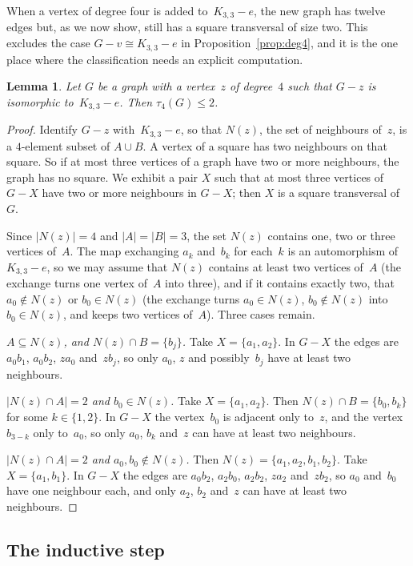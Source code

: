 \documentclass[11pt,letterpaper]{article}
\numberwithin{equation}{section}
\theoremstyle{plain}
\newtheorem{lemma}[theorem]{Lemma}
\theoremstyle{definition}
\theoremstyle{remark}
\newcommand{\Kme}{K_{3,3}-e}
\begin{document}
When a vertex of degree four is added to~$\Kme$, the new graph has twelve edges but, as we now show, still has a square transversal of size two. This excludes the case $G-v\cong\Kme$ in Proposition~\ref{prop:deg4}, and it is the one place where the classification needs an explicit computation.

\begin{lemma}\label{lem:extension}
Let $G$ be a graph with a vertex~$z$ of degree~$4$ such that $G-z$ is isomorphic to~$\Kme$. Then $\tau_4(G)\le2$.
\end{lemma}

\begin{proof}
Identify $G-z$ with~$\Kme$, so that $N(z)$, the set of neighbours of~$z$, is a $4$-element subset of $A\cup B$. A vertex of a square has two neighbours on that square. So if at most three vertices of a graph have two or more neighbours, the graph has no square. We exhibit a pair $X$ such that at most three vertices of $G-X$ have two or more neighbours in $G-X$; then $X$ is a square transversal of~$G$.

Since $|N(z)|=4$ and $|A|=|B|=3$, the set $N(z)$ contains one, two or three vertices of~$A$. The map exchanging $a_k$ and~$b_k$ for each~$k$ is an automorphism of~$\Kme$, so we may assume that $N(z)$ contains at least two vertices of~$A$ (the exchange turns one vertex of~$A$ into three), and if it contains exactly two, that $a_0\notin N(z)$ or $b_0\in N(z)$ (the exchange turns $a_0\in N(z)$, $b_0\notin N(z)$ into $b_0\in N(z)$, and keeps two vertices of~$A$). Three cases remain.

\emph{$A\subseteq N(z)$, and $N(z)\cap B=\{b_j\}$.} Take $X=\{a_1,a_2\}$. In $G-X$ the edges are $a_0b_1$, $a_0b_2$, $za_0$ and~$zb_j$, so only $a_0$, $z$ and possibly~$b_j$ have at least two neighbours.

\emph{$|N(z)\cap A|=2$ and $b_0\in N(z)$.} Take $X=\{a_1,a_2\}$. Then $N(z)\cap B=\{b_0,b_k\}$ for some $k\in\{1,2\}$. In $G-X$ the vertex~$b_0$ is adjacent only to~$z$, and the vertex $b_{3-k}$ only to~$a_0$, so only $a_0$, $b_k$ and~$z$ can have at least two neighbours.

\emph{$|N(z)\cap A|=2$ and $a_0,b_0\notin N(z)$.} Then $N(z)=\{a_1,a_2,b_1,b_2\}$. Take $X=\{a_1,b_1\}$. In $G-X$ the edges are $a_0b_2$, $a_2b_0$, $a_2b_2$, $za_2$ and~$zb_2$, so $a_0$ and~$b_0$ have one neighbour each, and only $a_2$, $b_2$ and~$z$ can have at least two neighbours.
\end{proof}

\subsection{The inductive step}
\end{document}
